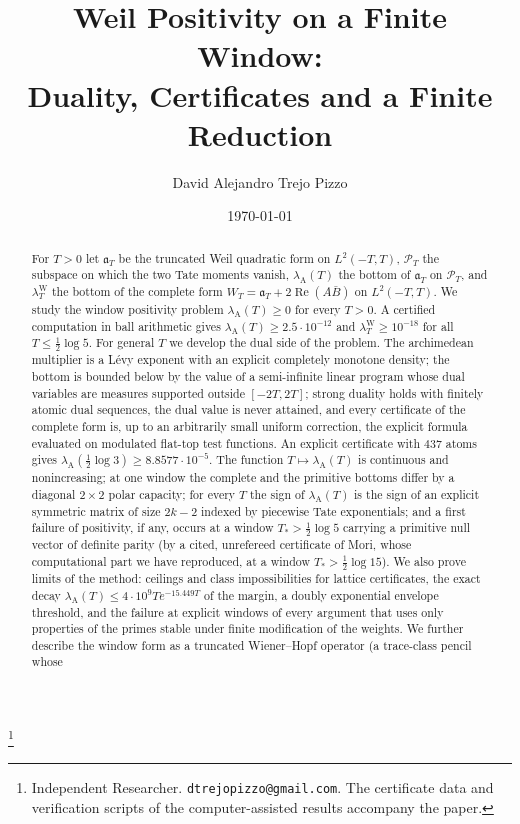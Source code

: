 \documentclass[11pt]{amsart}
\theoremstyle{definition}
\theoremstyle{remark}
\newcommand{\Rel}{\operatorname{Re}}
\newcommand{\PT}{\mathcal P_T}
\newcommand{\lamW}{\lambda^{\mathrm W}_T}
\newcommand{\lamA}{\lambda_{\mathrm A}(T)}
\begin{document}
\title[Weil positivity on a finite window]
{Weil Positivity on a Finite Window:\\
Duality, Certificates and a Finite Reduction}

\author{David Alejandro Trejo Pizzo}
\thanks{Independent Researcher. \texttt{dtrejopizzo@gmail.com}. The certificate data and verification
scripts of the computer-assisted results accompany the paper.}

\date{\today}

\begin{abstract}
For $T>0$ let $\mathfrak a_T$ be the truncated Weil quadratic form on $L^2(-T,T)$, $\PT$ the
subspace on which the two Tate moments vanish, $\lamA$ the bottom of $\mathfrak a_T$ on $\PT$, and
$\lamW$ the bottom of the complete form $W_T=\mathfrak a_T+2\Rel(A\bar B)$ on $L^2(-T,T)$. We study
the window positivity problem $\lamA\ge0$ for every $T>0$. A certified computation in ball
arithmetic gives $\lamA\ge2.5\cdot10^{-12}$ and $\lamW\ge10^{-18}$ for all $T\le\frac12\log5$. For
general $T$ we develop the dual side of the problem. The archimedean multiplier is a L\'evy exponent
with an explicit completely monotone density; the bottom is bounded below by the value of a
semi-infinite linear program whose dual variables are measures supported outside $[-2T,2T]$; strong
duality holds with finitely atomic dual sequences, the dual value is never attained, and every
certificate of the complete form is, up to an arbitrarily small uniform correction, the explicit formula
evaluated on modulated flat-top test functions. An explicit certificate with $437$ atoms gives
$\lambda_{\mathrm A}(\frac12\log3)\ge8.8577\cdot10^{-5}$. The function $T\mapsto\lamA$ is continuous and
nonincreasing; at one window the complete and the primitive bottoms differ by a diagonal $2\times2$
polar capacity; for every $T$ the sign of $\lamA$ is the sign of an explicit symmetric matrix of size
$2k-2$ indexed by piecewise Tate exponentials; and a first failure of positivity, if any, occurs at a
window $T_*>\frac12\log5$ carrying a primitive null vector of definite parity (by a cited, unrefereed
certificate of Mori, whose computational part we have reproduced, at a window $T_*>\frac12\log15$). We also prove limits of
the method: ceilings and class impossibilities for lattice certificates, the exact decay
$\lamA\le4\cdot10^9Te^{-15.449T}$ of the margin, a doubly exponential envelope threshold, and the
failure at explicit windows of every argument that uses only properties of the primes stable under
finite modification of the weights. We further describe the window form as a truncated Wiener--Hopf operator (a trace-class pencil whose

\end{abstract}
\end{document}
